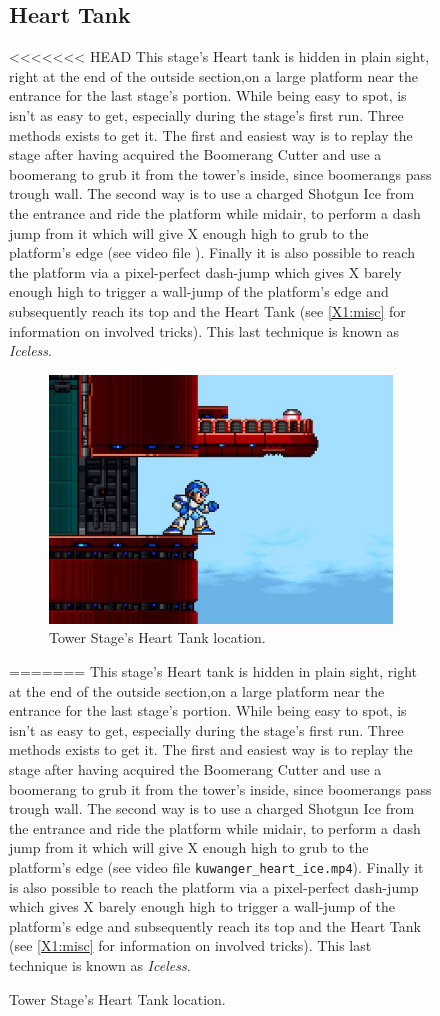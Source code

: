 \begin{figure}[htp]
\subsection{Heart Tank}
<<<<<<< HEAD
This stage's Heart tank is hidden in plain sight, right at the end of the outside section,on a large platform near the entrance for the last stage's portion. While being easy to spot, is isn't as easy to get, especially during the stage's first run. Three methods exists to get it. The first and easiest way is to replay the stage after having acquired the Boomerang Cutter and use a boomerang to grub it from the tower's inside, since boomerangs pass trough wall. The second way is to use a charged Shotgun Ice from the entrance and ride the platform while midair, to perform a dash jump from it which will give X enough high to grub to the platform's edge (see video file ). Finally it is also possible to reach the platform via a pixel-perfect dash-jump which gives X barely enough high to trigger a wall-jump of the platform's edge and subsequently reach its top and the Heart Tank (see \ref{X1:misc} for information on involved tricks). This last technique is known as \textit{Iceless}. 
\begin{figure}[htp]
	\centering
	\includegraphics[width=0.4\linewidth]{figures/X1/Boomer_kuwanger/Tower_heart.jpg}
	\caption{Tower Stage's Heart Tank location.}
\end{figure}
=======
This stage's Heart tank is hidden in plain sight, right at the end of the outside section,on a large platform near the entrance for the last stage's portion. While being easy to spot, is isn't as easy to get, especially during the stage's first run. Three methods exists to get it. The first and easiest way is to replay the stage after having acquired the Boomerang Cutter and use a boomerang to grub it from the tower's inside, since boomerangs pass trough wall. The second way is to use a charged Shotgun Ice from the entrance and ride the platform while midair, to perform a dash jump from it which will give X enough high to grub to the platform's edge (see video file \texttt{kuwanger\_heart\_ice.mp4}). Finally it is also possible to reach the platform via a pixel-perfect dash-jump which gives X barely enough high to trigger a wall-jump of the platform's edge and subsequently reach its top and the Heart Tank (see \ref{X1:misc} for information on involved tricks). This last technique is known as \textit{Iceless}. 

\end{figure}
